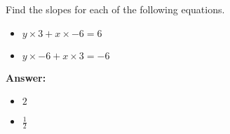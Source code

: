  Find the slopes for each of the following equations. \begin{itemize}\item \( y \times 3 + x \times -6 = 6 \)\item \( y \times -6 + x \times 3 = -6 \)\end{itemize}

        \textbf{Answer:} \begin{itemize}\item \( 2 \)\item \( \frac{1}{2} \)\end{itemize}
